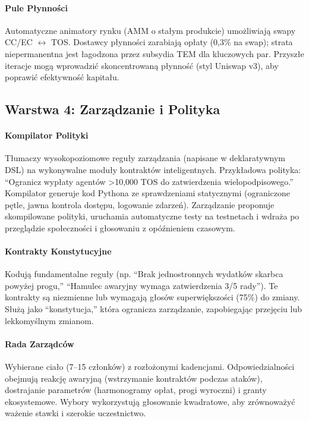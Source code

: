 \documentclass[11pt]{article}
\begin{document}
\paragraph{Pule Płynności} Automatyczne animatory rynku (AMM o stałym produkcie) umożliwiają swapy CC/EC $\leftrightarrow$ TOS. Dostawcy płynności zarabiają opłaty (0,3\% na swap); strata niepermanentna jest łagodzona przez subsydia TEM dla kluczowych par. Przyszłe iteracje mogą wprowadzić skoncentrowaną płynność (styl Uniswap v3), aby poprawić efektywność kapitału.

\subsection{Warstwa 4: Zarządzanie i Polityka}
\paragraph{Kompilator Polityki} Tłumaczy wysokopoziomowe reguły zarządzania (napisane w deklaratywnym DSL) na wykonywalne moduły kontraktów inteligentnych. Przykładowa polityka: ``Ogranicz wypłaty agentów >10,000 TOS do zatwierdzenia wielopodpisowego.'' Kompilator generuje kod Pythona ze sprawdzeniami statycznymi (ograniczone pętle, jawna kontrola dostępu, logowanie zdarzeń). Zarządzanie proponuje skompilowane polityki, uruchamia automatyczne testy na testnetach i wdraża po przeglądzie społeczności i głosowaniu z opóźnieniem czasowym.

\paragraph{Kontrakty Konstytucyjne} Kodują fundamentalne reguły (np. ``Brak jednostronnych wydatków skarbca powyżej progu,'' ``Hamulec awaryjny wymaga zatwierdzenia 3/5 rady''). Te kontrakty są niezmienne lub wymagają głosów superwiększości (75\%) do zmiany. Służą jako ``konstytucja,'' która ogranicza zarządzanie, zapobiegając przejęciu lub lekkomyślnym zmianom.

\paragraph{Rada Zarządców} Wybierane ciało (7--15 członków) z rozłożonymi kadencjami. Odpowiedzialności obejmują reakcję awaryjną (wstrzymanie kontraktów podczas ataków), dostrajanie parametrów (harmonogramy opłat, progi wyroczni) i granty ekosystemowe. Wybory wykorzystują głosowanie kwadratowe, aby zrównoważyć ważenie stawki i szerokie uczestnictwo.
\end{document}
